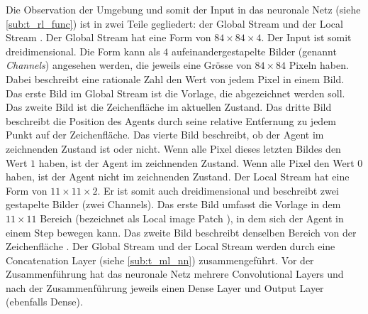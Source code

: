 Die Observation der Umgebung und somit der Input in das neuronale Netz (siehe
\ref{sub:t_rl_func}) ist in zwei Teile gegliedert: der Global Stream und
der Local Stream \cite[S. 4]{zhou_learning_2018}. Der Global Stream hat eine
Form von $84\times84\times4$. Der Input ist somit dreidimensional. Die Form kann
als $4$ aufeinandergestapelte Bilder (genannt \emph{Channels}) angesehen werden, die jeweils eine Grösse
von $84\times84$ Pixeln haben. Dabei beschreibt eine rationale Zahl den Wert von
jedem Pixel in einem Bild. Das erste Bild im Global Stream ist die Vorlage, die
abgezeichnet werden soll. Das zweite Bild ist die Zeichenfläche im aktuellen
Zustand. Das dritte Bild beschreibt die Position des Agents durch seine relative
Entfernung zu jedem Punkt auf der Zeichenfläche. Das vierte Bild beschreibt, ob
der Agent im zeichnenden Zustand ist oder nicht. Wenn alle Pixel dieses letzten
Bildes den Wert $1$ haben, ist der Agent im zeichnenden Zustand. Wenn alle Pixel
den Wert $0$ haben, ist der Agent nicht im zeichnenden Zustand. Der Local Stream
hat eine Form von $11\times11\times2$. Er ist somit auch dreidimensional und
beschreibt zwei gestapelte Bilder (zwei Channels). Das erste Bild umfasst die Vorlage in dem
$11\times11$ Bereich (bezeichnet als Local image Patch \cite[S.
5]{zhou_learning_2018}), in dem sich der Agent in einem Step bewegen kann. Das
zweite Bild beschreibt denselben Bereich von der Zeichenfläche \cite[S. 4
ff.]{zhou_learning_2018}. Der Global Stream und der Local Stream werden durch
eine Concatenation Layer (siehe \ref{sub:t_ml_nn}) zusammengeführt.
Vor der Zusammenführung hat das neuronale Netz mehrere Convolutional Layers und
nach der Zusammenführung jeweils einen Dense Layer und Output Layer (ebenfalls Dense).